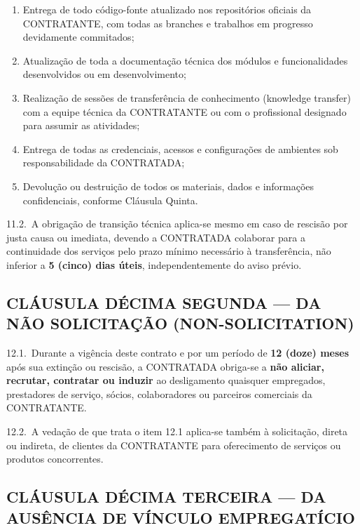 \documentclass[11pt, a4paper]{article}
\begin{document}
\begin{enumerate}[label=\alph*), leftmargin=1.8em]
    \item Entrega de todo código-fonte atualizado nos repositórios oficiais da CONTRATANTE, com todas as branches e trabalhos em progresso devidamente commitados;
    \item Atualização de toda a documentação técnica dos módulos e funcionalidades desenvolvidos ou em desenvolvimento;
    \item Realização de sessões de transferência de conhecimento (knowledge transfer) com a equipe técnica da CONTRATANTE ou com o profissional designado para assumir as atividades;
    \item Entrega de todas as credenciais, acessos e configurações de ambientes sob responsabilidade da CONTRATADA;
    \item Devolução ou destruição de todos os materiais, dados e informações confidenciais, conforme Cláusula Quinta.
\end{enumerate}

11.2.\ A obrigação de transição técnica aplica-se mesmo em caso de rescisão por justa causa ou imediata, devendo a CONTRATADA colaborar para a continuidade dos serviços pelo prazo mínimo necessário à transferência, não inferior a \textbf{5 (cinco) dias úteis}, independentemente do aviso prévio.

\subsection{CLÁUSULA DÉCIMA SEGUNDA — DA NÃO SOLICITAÇÃO (NON-SOLICITATION)}

12.1.\ Durante a vigência deste contrato e por um período de \textbf{12 (doze) meses} após sua extinção ou rescisão, a CONTRATADA obriga-se a \textbf{não aliciar, recrutar, contratar ou induzir} ao desligamento quaisquer empregados, prestadores de serviço, sócios, colaboradores ou parceiros comerciais da CONTRATANTE.

12.2.\ A vedação de que trata o item 12.1 aplica-se também à solicitação, direta ou indireta, de clientes da CONTRATANTE para oferecimento de serviços ou produtos concorrentes.

\subsection{CLÁUSULA DÉCIMA TERCEIRA — DA AUSÊNCIA DE VÍNCULO EMPREGATÍCIO}
\end{document}
